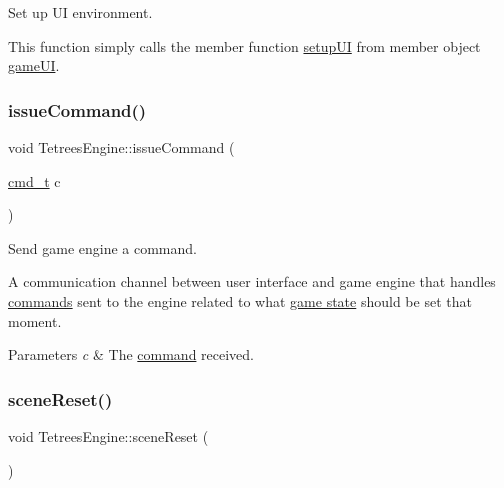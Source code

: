 Set up UI environment. 

This function simply calls the member function \hyperlink{classTetreesUI_a492d68860089cfbe52c5756b2c3cd2ae}{setup\+UI} from member object \hyperlink{classTetreesEngine_a01bf1d438236d5f57129ffb22adf59ce}{game\+UI}. \mbox{\label{classTetreesEngine_aa2a283d09b0b6ab7c03ea2265a2e3438}} 
\subsubsection{\texorpdfstring{issue\+Command()}{issueCommand()}}
{\footnotesize\ttfamily void Tetrees\+Engine\+::issue\+Command (\begin{DoxyParamCaption}\item[{\hyperlink{TetreesDefs_8hpp_aadc337e2620d6621659e63e87c45e79d}{cmd\+\_\+t}}]{c }\end{DoxyParamCaption})}



Send game engine a command. 

A communication channel between user interface and game engine that handles \hyperlink{TetreesDefs_8hpp_aadc337e2620d6621659e63e87c45e79d}{commands} sent to the engine related to what \hyperlink{TetreesDefs_8hpp_aebae08b2e3a36f1452b33acaf1eaab40}{game state} should be set that moment. 
\begin{DoxyParams}{Parameters}
{\em c} & The \hyperlink{TetreesDefs_8hpp_aadc337e2620d6621659e63e87c45e79d}{command} received. \\
\hline
\end{DoxyParams}
\mbox{\label{classTetreesEngine_acb719449a68465839ebb0a5e7724cc34}} 
\subsubsection{\texorpdfstring{scene\+Reset()}{sceneReset()}}
{\footnotesize\ttfamily void Tetrees\+Engine\+::scene\+Reset (\begin{DoxyParamCaption}{ }\end{DoxyParamCaption})\hspace{0.3cm}{\ttfamily [private]}}



